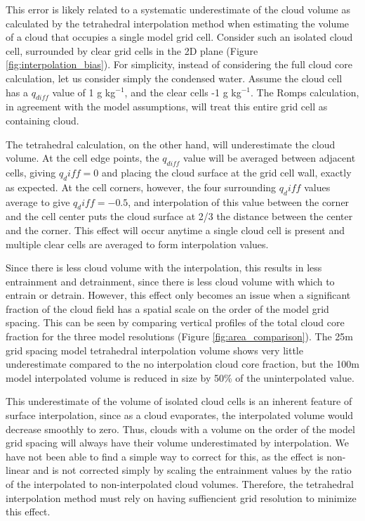 \documentclass[12pt]{article}
\begin{document}
This error is likely related to a systematic underestimate of the cloud volume 
as calculated by the tetrahedral interpolation method when estimating the 
volume of a cloud that occupies a single model grid cell.  Consider such an 
isolated cloud cell, surrounded by clear grid cells in the 2D plane (Figure 
\ref{fig:interpolation_bias}).  For simplicity, instead of considering the 
full cloud core calculation, let us consider simply the condensed water.
Assume the cloud cell has a $q_{diff}$ value of 1 g kg$^{-1}$, and the clear 
cells -1 g kg$^{-1}$.  The Romps calculation, in agreement with the model 
assumptions, will treat this entire grid cell as containing cloud.

The tetrahedral calculation, on the other hand, will underestimate the cloud 
volume.  At the cell edge points, the $q_{diff}$ value will be averaged between
adjacent cells, giving $q_diff = 0$ and placing the cloud surface at the grid 
cell wall, exactly as expected.  At the cell corners, however, the four 
surrounding $q_diff$ values average to give $q_diff = -0.5$, and interpolation 
of this value between the corner and the cell center puts the cloud surface 
at 2/3 the distance between the center and the corner.  This effect will occur 
anytime a single cloud cell is present and multiple clear cells are averaged 
to form interpolation values.

Since there is less cloud volume with the interpolation, this results in less 
entrainment and detrainment, since there is less cloud volume with which to 
entrain or detrain.  However, this effect only becomes an issue when a 
significant fraction of the cloud field has a spatial scale on the order of 
the model grid spacing.  This can be seen by comparing vertical profiles of 
the total cloud core fraction for the three model resolutions (Figure 
\ref{fig:area_comparison}).  The 25m grid spacing model tetrahedral 
interpolation volume shows very little underestimate compared to the no 
interpolation cloud core fraction, but the 100m model interpolated volume is 
reduced in size by 50\% of the uninterpolated value.

This underestimate of the volume of isolated cloud cells is an inherent 
feature of surface interpolation, since as a cloud evaporates, the 
interpolated volume would decrease smoothly to zero.  Thus, clouds with a 
volume on the order of the model grid spacing will always have their volume 
underestimated by interpolation.  We have not been able to find a simple way 
to correct for this, as the effect is non-linear and is not corrected simply 
by scaling the entrainment values by the ratio of the interpolated to 
non-interpolated cloud volumes.  Therefore, the tetrahedral interpolation 
method must rely on having suffiencient grid resolution to minimize this effect.
\end{document}
